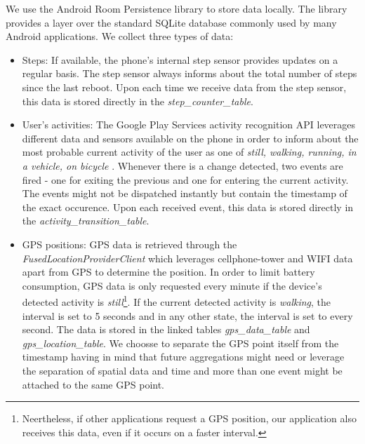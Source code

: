 We use the Android Room Persistence library \parencite{room} to store data locally. The library provides a layer over the standard SQLite database commonly used by many Android applications. We collect three types of data:
\begin{itemize}
	\item Steps: If available, the phone's internal step sensor provides updates on a regular basis. The step sensor always informs about the total number of steps since the last reboot. Upon each time we receive data from the step sensor, this data is stored directly in the \textit{step\_counter\_table}.
	\item User's activities: The Google Play Services  activity recognition API leverages different data and sensors available on the phone in order to inform about the most probable current activity of the user as one of \textit{still, walking, running, in a vehicle, on bicycle} \parencite{detected-activity}. Whenever there is a change detected, two events are fired - one for exiting the previous and one for entering the current activity. The events might not be dispatched instantly but contain the timestamp of the exact occurence. Upon each received event, this data is stored directly in the \textit{activity\_transition\_table}.
	\item GPS positions: GPS data is retrieved through the \textit{FusedLocationProviderClient} which leverages cellphone-tower and WIFI data apart from GPS to determine the position. In order to limit battery consumption, GPS data is only requested every minute if the device's detected activity is \textit{still}\footnote{Neertheless, if other applications request a GPS position, our application also receives this data, even if it occurs on a faster interval.}. If the current detected activity is \textit{walking}, the interval is set to 5 seconds and in any other state, the interval is set to every second. The data is stored in the linked tables \textit{gps\_data\_table} and \textit{gps\_location\_table}. We choosse to separate the GPS point itself from the timestamp having in mind that future aggregations might need or leverage the separation of spatial data and time and more than one event might be attached to the same GPS point.
\end{itemize}

